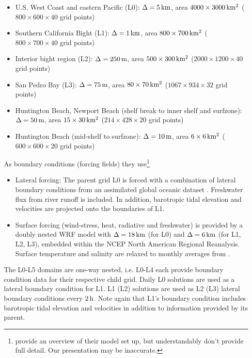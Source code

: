 \documentclass[12pt,a4paper]{article}
\begin{document}
\begin{itemize}
	\item U.S. West Coast and eastern Pacific (L0):  $\Delta=5\,\rm km$, area $4000\times3000\,\rm km^2$ ($800\times600\times40$ grid points)
	\item Southern California Bight (L1):  $\Delta=1\,\rm km$, area $800\times700\,\rm km^2$ ($800\times700\times40$ grid points)
	\item Interior bight region (L2): $\Delta=250\,\rm m$, area $500\times300\,\rm km^2$ ($2000\times1200\times40$ grid points)
	\item San Pedro Bay (L3): $\Delta=75\,\rm m$, area $80\times70\,\rm km^2$ ($1067\times934\times32$ grid points)
	\item Huntington Beach, Newport Beach (shelf break to inner shelf and surfzone): $\Delta=50\,\rm m$, area $15\times30\,\rm km^2$ ($214\times428\times20$ grid points)
	\item Huntington Beach (mid-shelf to surfzone): $\Delta=10\,\rm m$, area $6\times6\,\rm km^2$ ($600\times600\times20$ grid points)
\end{itemize}

 As boundary conditions (forcing fields) they use\footnote{\cite{kumar2015midshelf} provide an overview of their model set up, but understandably don't provide full detail. Our presentation may be inaccurate.}

\begin{itemize}
	\item Lateral forcing: The parent grid L0 is forced with a combination of lateral boundary conditions from an assimilated global oceanic dataset \citep{carton2008reanalysis}. Freshwater flux from river runoff is included. In addition, barotropic tidal elevation and velocities are projected onto the boundaries of L1.
	
	\item Surface forcing (wind-stress, heat, radiative and freshwater) is provided by a doubly nested WRF model with $\Delta=18\,\rm km$ (for L0) and $\Delta=6\,\rm km$ (for L1, L2, L3), embedded within the NCEP North American Regional Reanalysis. Surface temperature and salinity are relaxed to monthly averages from \cite{carton2008reanalysis}.
	
\end{itemize}

The L0-L5 domains are one-way nested, i.e. L0-L4 each provide boundary condition data for their respective child grid. Daily L0 solutions are used as a lateral boundary condition for L1. L1 (L2) solutions are used as L2 (L3) lateral boundary conditions every $2\,\rm h$. Note again that L1's boundary condition includes barotropic tidal elevation and velocities in addition to information provided by its parent.
\end{document}
